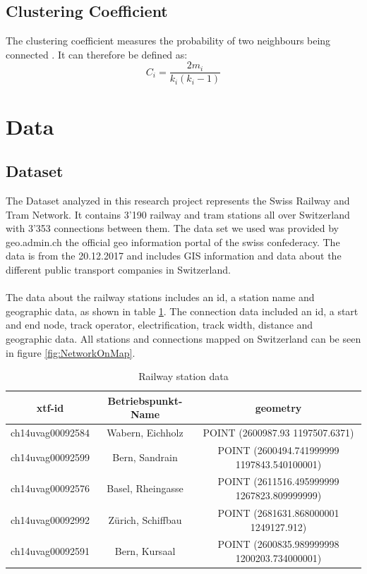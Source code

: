 \documentclass{Resources/netsci-project}
\begin{document}
\subsection{Clustering Coefficient}
The clustering coefficient measures the probability of two neighbours being connected \autocite{ComplexTopology}. It can therefore be defined as:
\begin{equation} \label{eqRestMass}
C_{i} =\dfrac{2m_i}{k_i(k_i -1)}
\end{equation}

\section{Data}
\subsection{Dataset}
The Dataset analyzed in this research project represents the Swiss Railway and Tram Network. It contains 3’190 railway and tram stations all over Switzerland with 3'353 connections between them. The data set we used was provided by geo.admin.ch the official geo information portal of the swiss confederacy. The data is from the 20.12.2017 and includes GIS information and data about the different public transport companies in Switzerland. \autocite{Dataset}
\\~\\
The data about the railway stations includes an id, a station name and geographic data, as shown in table \ref{tbl:RailwayStationData}. The connection data included an id, a start and end node, track operator, electrification, track width, distance and geographic data. All stations and connections mapped on Switzerland can be seen in figure \ref{fig:NetworkOnMap}.

\begin{table}[H]
\centering
\begin{tabular}{c c c }
\hline 
xtf-id & Betriebspunkt-Name &  geometry\\ 
\hline 
ch14uvag00092584 & Wabern, Eichholz & POINT (2600987.93 1197507.6371) \\
ch14uvag00092599 & Bern, Sandrain & POINT (2600494.741999999 1197843.540100001) \\
ch14uvag00092576 & Basel, Rheingasse & POINT (2611516.495999999 1267823.809999999) \\
ch14uvag00092992 & Zürich, Schiffbau & POINT (2681631.868000001 1249127.912) \\
ch14uvag00092591 & Bern, Kursaal & POINT (2600835.989999998 1200203.734000001) \\
\hline 
\end{tabular}
\caption{Railway station data}
\label{tbl:RailwayStationData}
\end{table}
\end{document}
